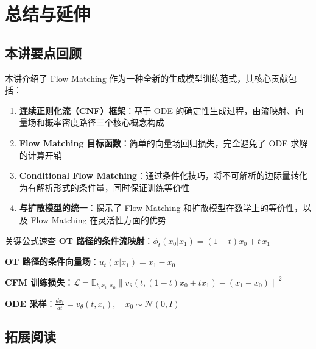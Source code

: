 \section{总结与延伸}

\subsection{本讲要点回顾}

本讲介绍了 Flow Matching 作为一种全新的生成模型训练范式，其核心贡献包括：

\begin{enumerate}
    \item \textbf{连续正则化流（CNF）框架}：基于 ODE 的确定性生成过程，由流映射、向量场和概率密度路径三个核心概念构成
    \item \textbf{Flow Matching 目标函数}：简单的向量场回归损失，完全避免了 ODE 求解的计算开销
    \item \textbf{Conditional Flow Matching}：通过条件化技巧，将不可解析的边际量转化为有解析形式的条件量，同时保证训练等价性
    \item \textbf{与扩散模型的统一}：揭示了 Flow Matching 和扩散模型在数学上的等价性，以及 Flow Matching 在灵活性方面的优势
\end{enumerate}

\begin{importantbox}{关键公式速查}
\textbf{OT 路径的条件流映射}：$\phi_t(x_0 | x_1) = (1 - t)x_0 + t \, x_1$

\textbf{OT 路径的条件向量场}：$u_t(x | x_1) = x_1 - x_0$

\textbf{CFM 训练损失}：$\mathcal{L} = \mathbb{E}_{t, x_1, x_0} \left\| v_\theta(t, (1-t)x_0 + tx_1) - (x_1 - x_0) \right\|^2$

\textbf{ODE 采样}：$\frac{dx_t}{dt} = v_\theta(t, x_t), \quad x_0 \sim \mathcal{N}(0, I)$
\end{importantbox}

\subsection{拓展阅读}

